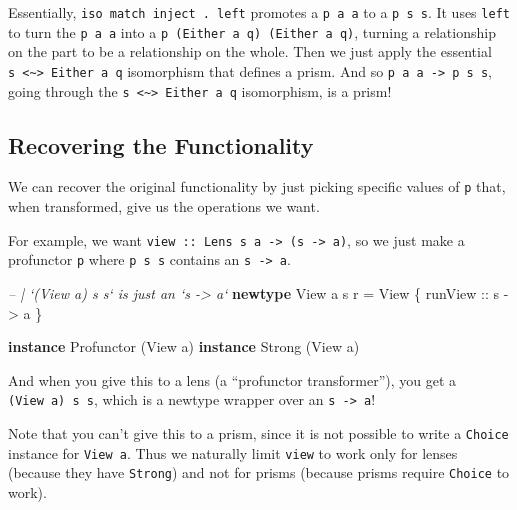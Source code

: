 \documentclass[]{article}
\newenvironment{Shaded}{}{}
\newcommand{\CommentTok}[1]{\textcolor[rgb]{0.38,0.63,0.69}{\textit{#1}}}
\newcommand{\DataTypeTok}[1]{\textcolor[rgb]{0.56,0.13,0.00}{#1}}
\newcommand{\FunctionTok}[1]{\textcolor[rgb]{0.02,0.16,0.49}{#1}}
\newcommand{\KeywordTok}[1]{\textcolor[rgb]{0.00,0.44,0.13}{\textbf{#1}}}
\newcommand{\NormalTok}[1]{#1}
\newcommand{\OtherTok}[1]{\textcolor[rgb]{0.00,0.44,0.13}{#1}}
\begin{document}
Essentially, \texttt{iso\ match\ inject\ .\ left\textquotesingle{}} promotes a
\texttt{p\ a\ a} to a \texttt{p\ s\ s}. It uses \texttt{left\textquotesingle{}}
to turn the \texttt{p\ a\ a} into a \texttt{p\ (Either\ a\ q)\ (Either\ a\ q)},
turning a relationship on the part to be a relationship on the whole. Then we
just apply the essential
\texttt{s\ \textless{}\textasciitilde{}\textgreater{}\ Either\ a\ q} isomorphism
that defines a prism. And so \texttt{p\ a\ a\ -\textgreater{}\ p\ s\ s}, going
through the \texttt{s\ \textless{}\textasciitilde{}\textgreater{}\ Either\ a\ q}
isomorphism, is a prism!

\hypertarget{recovering-the-functionality}{%
\subsection{Recovering the Functionality}\label{recovering-the-functionality}}

We can recover the original functionality by just picking specific values of
\texttt{p} that, when transformed, give us the operations we want.

For example, we want
\texttt{view\ ::\ Lens\textquotesingle{}\ s\ a\ -\textgreater{}\ (s\ -\textgreater{}\ a)},
so we just make a profunctor \texttt{p} where \texttt{p\ s\ s} contains an
\texttt{s\ -\textgreater{}\ a}.

\begin{Shaded}
\begin{Highlighting}[]
\CommentTok{-- | `(View a) s s` is just an `s -> a`}
\KeywordTok{newtype} \DataTypeTok{View}\NormalTok{ a s r }\FunctionTok{=} \DataTypeTok{View}\NormalTok{ \{}\OtherTok{ runView ::}\NormalTok{ s }\OtherTok{->}\NormalTok{ a \}}

\KeywordTok{instance} \DataTypeTok{Profunctor}\NormalTok{ (}\DataTypeTok{View}\NormalTok{ a)}
\KeywordTok{instance} \DataTypeTok{Strong}\NormalTok{ (}\DataTypeTok{View}\NormalTok{ a)}
\end{Highlighting}
\end{Shaded}

And when you give this to a lens (a ``profunctor transformer''), you get a
\texttt{(View\ a)\ s\ s}, which is a newtype wrapper over an
\texttt{s\ -\textgreater{}\ a}!

Note that you can't give this to a prism, since it is not possible to write a
\texttt{Choice} instance for \texttt{View\ a}. Thus we naturally limit
\texttt{view} to work only for lenses (because they have \texttt{Strong}) and
not for prisms (because prisms require \texttt{Choice} to work).
\end{document}
